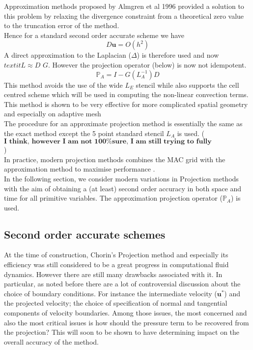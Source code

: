 Approximation methods proposed by Almgren et al 1996 \cite{almgren1996numerical} provided a solution to this problem by relaxing the divergence constraint from a theoretical zero value to the truncation error of the method. \\
Hence for a standard second order accurate scheme we have
\begin{equation*}
D \textbf{u} = O(h^2)
\end{equation*}
A direct approximation to the Laplacian ($\Delta$) is therefore used and now $textit{L} \approx \textit{D G}$. However the projection operator (below) is now not idempotent.
\begin{equation}
\mathbb{P}_A = I - G(L_A^{-1})D
\end{equation}
This method avoids the use of the wide $\textit{L}_E$ stencil while also supports the cell centred scheme which will be used in computing the non-linear convection terms. This method is shown to be very effective for more complicated spatial geometry and especially on adaptive mesh \cite{howell1997adaptive}\\

The procedure for an approximate projection method is essentially the same as the exact method except the 5 point standard stencil $\textit{L}_A$ is used. 
($\textbf{I think, however I am not 100\% sure, I am still trying to fully understand references 4,5}$)\\

In practice, modern projection methods combines the MAC grid with the approximation method to maximise performance \cite{brown2001accurate}.\\

In the following section, we consider modern variations in Projection methods with the aim of obtaining a (at least) second order accuracy in both space and time for all primitive variables. The approximation projection operator ($\mathbb{P}_A$) is used.\\



\subsection{Second order accurate schemes}

At the time of construction, Chorin's Projection method and especially its efficiency was still considered to be a great progress in computational fluid dynamics. However there are still many drawbacks associated with it. In particular, as noted before there are a lot of controversial discussion about the choice of boundary conditions. For instance the intermediate velocity ($\textbf{u}^*$) and the projected velocity; the choice of specification of normal and tangential components of velocity boundaries. Among those issues, the most concerned and also the most critical issues is how should the pressure term to be recovered from the projection? This will soon to be shown to have determining impact on the overall accuracy of the method.\\

